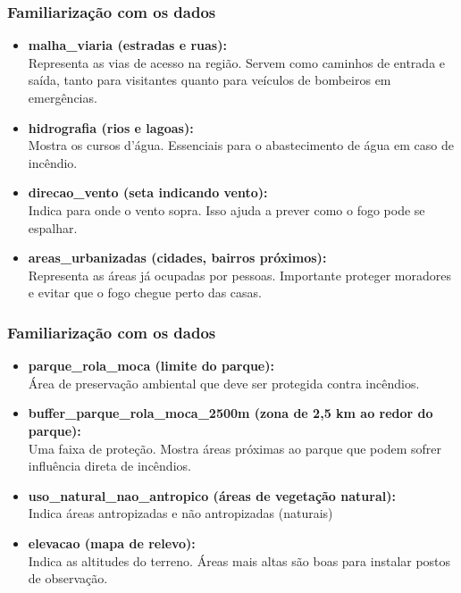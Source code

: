 \documentclass[t,darkblue]{beamer}
\begin{document}
\begin{frame}
	\frametitle{Familiarização com os dados}
	\begin{itemize}
		\item \textbf{malha\_viaria (estradas e ruas):} \\
		Representa as vias de acesso na região. Servem como caminhos de entrada e saída, tanto para visitantes quanto para veículos de bombeiros em emergências.
		
		\item \textbf{hidrografia (rios e lagoas):} \\
		Mostra os cursos d’água. Essenciais para o abastecimento de água em caso de incêndio.
		
		\item \textbf{direcao\_vento (seta indicando vento):} \\
		Indica para onde o vento sopra. Isso ajuda a prever como o fogo pode se espalhar.
		
		\item \textbf{areas\_urbanizadas (cidades, bairros próximos):} \\
		Representa as áreas já ocupadas por pessoas. Importante proteger moradores e evitar que o fogo chegue perto das casas.
	\end{itemize}
\end{frame}

\begin{frame}
	\frametitle{Familiarização com os dados}
	\begin{itemize}

		\item \textbf{parque\_rola\_moca (limite do parque):} \\
		Área de preservação ambiental que deve ser protegida contra incêndios.
		
		\item \textbf{buffer\_parque\_rola\_moca\_2500m (zona de 2,5 km ao redor do parque):} \\
		Uma faixa de proteção. Mostra áreas próximas ao parque que podem sofrer influência direta de incêndios.
		
		\item \textbf{uso\_natural\_nao\_antropico (áreas de vegetação natural):} \\
		Indica áreas antropizadas e não antropizadas (naturais)
		
		\item \textbf{elevacao (mapa de relevo):} \\
		Indica as altitudes do terreno. Áreas mais altas são boas para instalar postos de observação.
	\end{itemize}
\end{frame}
	
\end{document}
